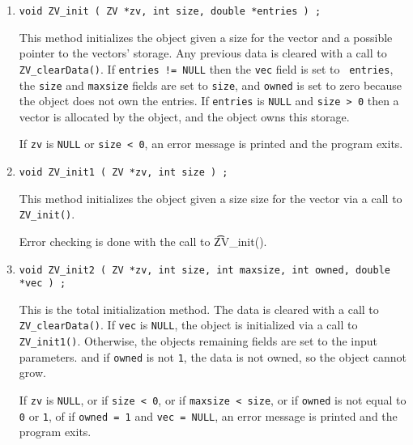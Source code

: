 \begin{enumerate}
\item
\begin{verbatim}
void ZV_init ( ZV *zv, int size, double *entries ) ;
\end{verbatim}
This method initializes the object given a size for the vector
and a possible pointer to the vectors' storage.
Any previous data is cleared with a call to {\tt ZV\_clearData()}.
If {\tt entries != NULL} then the {\tt vec} field is set to {\tt
entries}, the {\tt size} and {\tt maxsize} fields are set to 
{\tt size}, and {\tt owned} is set to zero
because the object does not own the entries.
If {\tt entries} is {\tt NULL} and {\tt size > 0} then a vector 
is allocated by the object, and the object owns this storage.
\par {}
If {\tt zv} is {\tt NULL} or {\tt size < 0},
an error message is printed and the program exits.
\item
\begin{verbatim}
void ZV_init1 ( ZV *zv, int size ) ;
\end{verbatim}
This method initializes the object given a size size for the vector
via a call to {\tt ZV\_init()}.
\par {}
Error checking is done with the call to {\t ZV\_init()}.
\item
\begin{verbatim}
void ZV_init2 ( ZV *zv, int size, int maxsize, int owned, double *vec ) ;
\end{verbatim}
This is the total initialization method.
The data is cleared with a call to {\tt ZV\_clearData()}.
If {\tt vec} is {\tt NULL}, the object is initialized via a call
to {\tt ZV\_init1()}.
Otherwise, the objects remaining fields are set to the input
parameters.
and if {\tt owned} is not {\tt 1}, the data is not owned, so the
object cannot grow.
\par {}
If {\tt zv} is {\tt NULL}, 
or if {\tt size < 0},
or if {\tt maxsize < size},
or if {\tt owned} is not equal to {\tt 0} or {\tt 1},
of if { \tt owned = 1} and {\tt vec = NULL},
an error message is printed and the program exits.

\end{enumerate}

